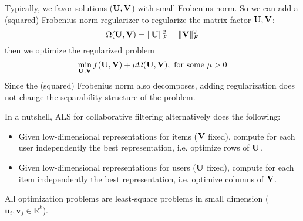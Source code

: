 \documentclass[../book-template.tex]{subfiles}
\begin{document}
\par Typically, we favor solutions (${\bf U,V}$) with small Frobenius norm. So we can add a (squared) Frobenius norm regularizer to regularize the matrix factor ${\bf U,V}$:
\begin{equation*}
	\Omega({\bf U,V})=\|{\bf U}\|_F^2 + \|{\bf V}\|_F^2
\end{equation*}
then we optimize the regularized problem
\begin{equation*}
	\min_{{\bf U,V}} f({\bf U,V})+\mu\Omega({\bf U,V}) ,\ \text{for some }\mu>0
\end{equation*}
Since the (squared) Frobenius norm also decomposes, adding regularization does not change the separability structure of the problem.
\par In a nutshell, ALS for collaborative filtering alternatively does the following:
\begin{itemize}
	\item Given low-dimensional representations for items (${\bf V}$ fixed), compute for each user independently the best representation, i.e. optimize rows of ${\bf U}$.
	\item Given low-dimensional representations for users (${\bf U}$ fixed), compute for each item independently the best representation, i.e. optimize columns of ${\bf V}$.
\end{itemize}
All optimization problems are least-square problems in small dimension ($\bm{u}_i,\bm{v}_j\in \mathbb{R}^k$).
\end{document}
